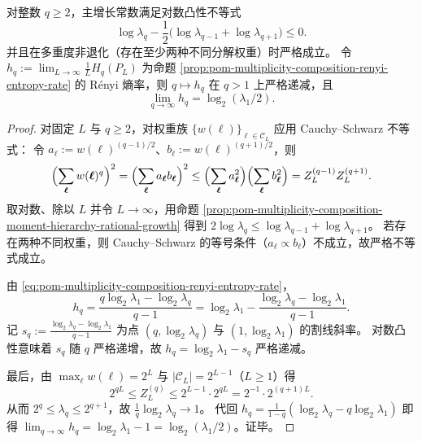 \begin{proposition}\label{prop:pom-multiplicity-composition-logconvex-lambdaq}
对整数 \(q\ge 2\)，主增长常数满足对数凸性不等式
\[
\boxed{\;
\log \lambda_q-\frac12\bigl(\log \lambda_{q-1}+\log \lambda_{q+1}\bigr)\le 0.\;}
\]
并且在多重度非退化（存在至少两种不同分解权重）时严格成立。
令
\(
h_q:=\lim_{L\to\infty}\frac{1}{L}H_q(P_L)
\)
为命题 \ref{prop:pom-multiplicity-composition-renyi-entropy-rate} 的 Rényi 熵率，则 \(q\mapsto h_q\) 在 \(q>1\) 上严格递减，且
\[
\boxed{\;
\lim_{q\to\infty}h_q=\log_2(\lambda_1/2).\;}
\]
\end{proposition}
\begin{proof}
对固定 \(L\) 与 \(q\ge 2\)，对权重族 \(\{w(\boldsymbol{\ell})\}_{\boldsymbol{\ell}\in\mathcal{C}_L}\) 应用 Cauchy--Schwarz 不等式：
令 \(a_{\boldsymbol{\ell}}:=w(\boldsymbol{\ell})^{(q-1)/2}\)、\(b_{\boldsymbol{\ell}}:=w(\boldsymbol{\ell})^{(q+1)/2}\)，则
\[
\Bigl(\sum_{\boldsymbol{\ell}}w(\boldsymbol{\ell})^{q}\Bigr)^2
=\Bigl(\sum_{\boldsymbol{\ell}}a_{\boldsymbol{\ell}}b_{\boldsymbol{\ell}}\Bigr)^2
\le
\Bigl(\sum_{\boldsymbol{\ell}}a_{\boldsymbol{\ell}}^2\Bigr)\Bigl(\sum_{\boldsymbol{\ell}}b_{\boldsymbol{\ell}}^2\Bigr)
=Z_L^{(q-1)}Z_L^{(q+1)}.
\]
取对数、除以 \(L\) 并令 \(L\to\infty\)，用命题 \ref{prop:pom-multiplicity-composition-moment-hierarchy-rational-growth} 得到
\(
2\log\lambda_q\le \log\lambda_{q-1}+\log\lambda_{q+1}
\)。
若存在两种不同权重，则 Cauchy--Schwarz 的等号条件（\(a_{\boldsymbol{\ell}}\propto b_{\boldsymbol{\ell}}\)）不成立，故严格不等式成立。
\par
由 \eqref{eq:pom-multiplicity-composition-renyi-entropy-rate}，
\[
h_q
=\frac{q\log_2\lambda_1-\log_2\lambda_q}{q-1}
=\log_2\lambda_1-\frac{\log_2\lambda_q-\log_2\lambda_1}{q-1}.
\]
记 \(s_q:=\frac{\log_2\lambda_q-\log_2\lambda_1}{q-1}\) 为点 \((q,\log_2\lambda_q)\) 与 \((1,\log_2\lambda_1)\) 的割线斜率。
对数凸性意味着 \(s_q\) 随 \(q\) 严格递增，故 \(h_q=\log_2\lambda_1-s_q\) 严格递减。
\par
最后，由 \(\max_{\boldsymbol{\ell}}w(\boldsymbol{\ell})=2^L\) 与 \(|\mathcal{C}_L|=2^{L-1}\)（\(L\ge 1\)）得
\[
2^{qL}\le Z_L^{(q)}\le 2^{L-1}\cdot 2^{qL}=2^{-1}\cdot 2^{(q+1)L}.
\]
从而 \(2^q\le \lambda_q\le 2^{q+1}\)，故 \(\frac{1}{q}\log_2\lambda_q\to 1\)。
代回 \(h_q=\frac{1}{1-q}(\log_2\lambda_q-q\log_2\lambda_1)\) 即得
\(
\lim_{q\to\infty}h_q=\log_2\lambda_1-1=\log_2(\lambda_1/2)
\)。证毕。
\end{proof}



\endinput
